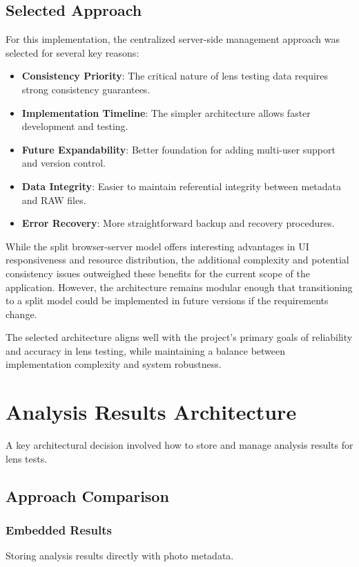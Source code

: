 \subsection{Selected Approach}

For this implementation, the centralized server-side management approach was selected for several key reasons:

\begin{itemize}
    \item \textbf{Consistency Priority}: The critical nature of lens testing data requires strong consistency guarantees.
    \item \textbf{Implementation Timeline}: The simpler architecture allows faster development and testing.
    \item \textbf{Future Expandability}: Better foundation for adding multi-user support and version control.
    \item \textbf{Data Integrity}: Easier to maintain referential integrity between metadata and RAW files.
    \item \textbf{Error Recovery}: More straightforward backup and recovery procedures.
\end{itemize}

While the split browser-server model offers interesting advantages in UI responsiveness and resource distribution, the additional complexity and potential consistency issues outweighed these benefits for the current scope of the application. However, the architecture remains modular enough that transitioning to a split model could be implemented in future versions if the requirements change.

The selected architecture aligns well with the project's primary goals of reliability and accuracy in lens testing, while maintaining a balance between implementation complexity and system robustness.

\section{Analysis Results Architecture}

A key architectural decision involved how to store and manage analysis results for lens tests.

\subsection{Approach Comparison}

\subsubsection{Embedded Results}
Storing analysis results directly with photo metadata.

